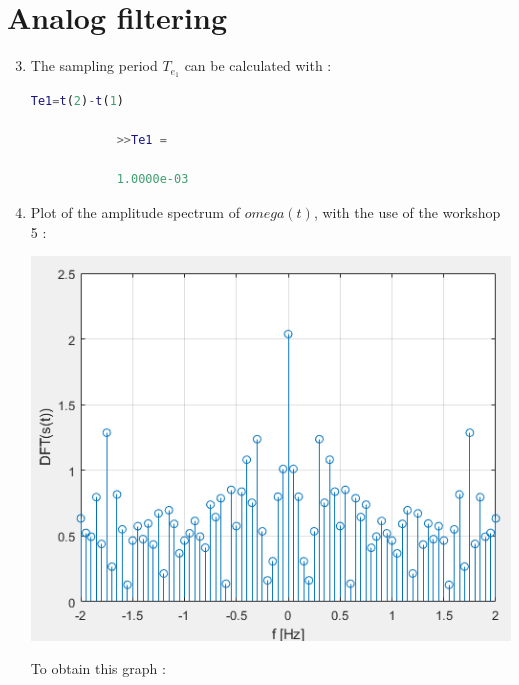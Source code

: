\documentclass[a4paper,12pt]{article}
\begin{document}
\newpage
\section{Analog filtering}

\begin{enumerate}[label={\color{blue}\arabic*)}]
    \setcounter{enumi}{2}
    \item The sampling period \(T_{e_1}\) can be calculated with :

        \begin{lstlisting}[style=Matlab-editor,language=Matlab, basicstyle=\small\ttfamily]
            Te1=t(2)-t(1)

            >>Te1 =

            1.0000e-03

        \end{lstlisting}

    \item
    Plot of the amplitude spectrum of \(omega(t)\), with the use of the workshop 5 :

    \begin{multicols}{2}

        \begin{flushleft}
            \includegraphics[scale=0.35]{Images/DFT.png}
            \label{Figure2}
        \end{flushleft}

    \columnbreak

    To obtain this graph :


\end{multicols}
\end{enumerate}
\end{document}
